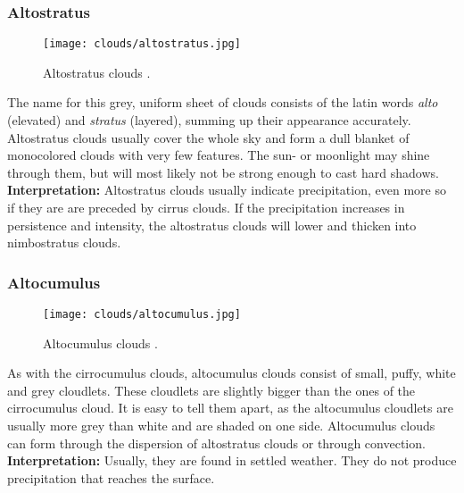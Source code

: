 \clearpage

\subsubsection{Altostratus}
\begin{wrapfigure}[11]{r}{6.3cm}
    \vspace{-\baselineskip}
    \texttt{[image: clouds/altostratus.jpg]}
    \caption{Altostratus clouds \protect\cite{cloudtypes:meteoblue}.}
    \label{img:clouds:altostratus}
\end{wrapfigure}
The name for this grey, uniform sheet of clouds consists of the latin words \emph{alto} (elevated) and \emph{stratus} (layered), summing up their appearance accurately.
Altostratus clouds usually cover the whole sky and form a dull blanket of monocolored clouds with very few features.
The sun- or moonlight may shine through them, but will most likely not be strong enough to cast hard shadows.
\emptyline
\textbf{Interpretation:}
Altostratus clouds usually indicate \gls{precipitation}, even more so if they are are preceded by cirrus clouds.
If the \gls{precipitation} increases in persistence and intensity, the altostratus clouds will lower and thicken into nimbostratus clouds.


\subsubsection{Altocumulus}
\begin{wrapfigure}[9]{r}{6.3cm}
    \vspace{-\baselineskip}
    \texttt{[image: clouds/altocumulus.jpg]}
    \caption{Altocumulus clouds \protect\cite{cloudtypes:wiki:altocumulus}.}
    \label{img:clouds:altocumulus}
\end{wrapfigure}
As with the cirrocumulus clouds, altocumulus clouds consist of small, puffy, white and grey \gls{cloudlet}s.
These \gls{cloudlet}s are slightly bigger than the ones of the cirrocumulus cloud.
It is easy to tell them apart, as the altocumulus \gls{cloudlet}s are usually more grey than white and are shaded on one side.
Altocumulus clouds can form through the dispersion of altostratus clouds or through \gls{convection}.
\emptyline
\textbf{Interpretation:}
Usually, they are found in settled weather. They do not produce \gls{precipitation} that reaches the surface.


